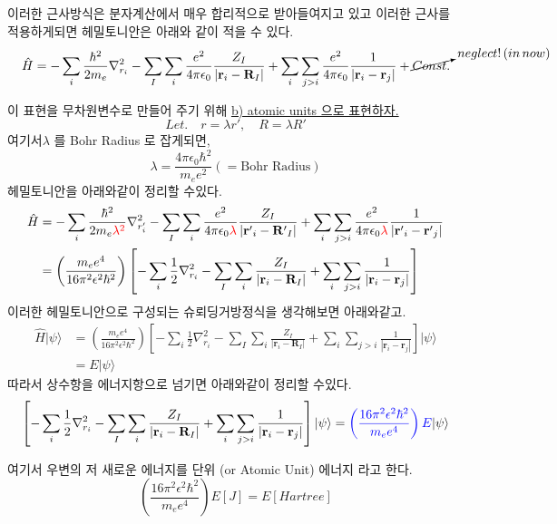 \documentclass[11pt]{article}
\begin{document}
\begin{enumerate}[label=3)]
\begin{enumerate}[label=\(\mathrm{i}\))]
\begin{tcolorbox}[enhanced, breakable, colback=gray!10, colframe=black, title=Definition: Born-oppenheimer Approximation]
\begin{minipage}[t]{0.48\textwidth}
\end{minipage}

\end{tcolorbox}

이러한 근사방식은 분자계산에서 매우 합리적으로 받아들여지고 있고 이러한 근사를 적용하게되면 헤밀토니안은 아래와 같이 적을 수 있다. 
\[
\hat{H} = -\sum_i \frac{\hbar^2}{2 m_e}\nabla_{r_i}^2 -  \sum_I \sum_i \frac{e^2}{4\pi \epsilon_0}\frac{Z_I}{|\mathbf{r}_i-\mathbf{R}_I|}
+ \sum_i \sum_{j>i} \frac{e^2}{4\pi \epsilon_0} \frac{1}{|\mathbf{r}_i - \mathbf{r}_j|} + \cancelto{neglect! \, (in \,now)}{Const.}
\]

이 표현을 무차원변수로 만들어 주기 위해 \underline{b) atomic units 으로 표현하자.} 
\[Let.\quad r=\lambda r', \quad R=\lambda R'\]
여기서\(\lambda\) 를 Bohr Radius 로 잡게되면,
\[\lambda=\frac{4\pi\epsilon_0\hbar^2}{m_ee^2} (=\text{Bohr Radius})\]
헤밀토니안을 아래와같이 정리할 수있다. 
\begin{align*}
\hat{H} &= -\sum_i \frac{\hbar^2}{2 m_e{\color{red} {\lambda^2}}}\nabla_{r_i'}^2 -  \sum_I \sum_i \frac{e^2}{4\pi \epsilon_0{\color{red} {\lambda}}}\frac{Z_I}{|\mathbf{r'}_i-\mathbf{R'}_I|}
+ \sum_i \sum_{j>i} \frac{e^2}{4\pi \epsilon_0{\color{red} {\lambda}}} \frac{1}{|\mathbf{r'}_i - \mathbf{r'}_j|} \\
&=\left(\frac{m_ee^4}{16\pi^2\epsilon^2\hbar^2}\right)\left[-\sum_i \frac{1}{2}\nabla_{r_i}^2 -  \sum_I \sum_i \frac{Z_I}{|\mathbf{r}_i-\mathbf{R}_I|}
+ \sum_i \sum_{j>i} \frac{1}{|\mathbf{r}_i - \mathbf{r}_j|}\right]
\end{align*}
이러한 헤밀토니안으로 구성되는 슈뢰딩거방정식을 생각해보면 아래와같고. 
\begin{align*}
\hat{H}\vert\psi\rangle &= \left(\frac{m_ee^4}{16\pi^2\epsilon^2\hbar^2}\right)\left[-\sum_i \frac{1}{2}\nabla_{r_i}^2 -  \sum_I \sum_i \frac{Z_I}{|\mathbf{r}_i-\mathbf{R}_I|}
+ \sum_i \sum_{j>i} \frac{1}{|\mathbf{r}_i - \mathbf{r}_j|}\right]\vert\psi\rangle\\
&=E\vert\psi\rangle
\end{align*}
따라서 상수항을 에너지항으로 넘기면 아래와같이 정리할 수있다. 
\[
\left[-\sum_i \frac{1}{2}\nabla_{r_i}^2 -  \sum_I \sum_i \frac{Z_I}{|\mathbf{r}_i-\mathbf{R}_I|}
+ \sum_i \sum_{j>i} \frac{1}{|\mathbf{r}_i - \mathbf{r}_j|}\right]\vert\psi\rangle = {\color{blue}\left(\frac{16\pi^2\epsilon^2\hbar^2}{m_ee^4}\right)E} \vert\psi\rangle
\]

여기서 우변의 저 새로운 에너지를  단위 (or Atomic Unit) 에너지 라고 한다. 
\[
\left(\frac{16\pi^2\epsilon^2\hbar^2}{m_ee^4}\right)E[J] = E[Hartree]
\]



\end{enumerate}
\end{enumerate}
\end{document}
